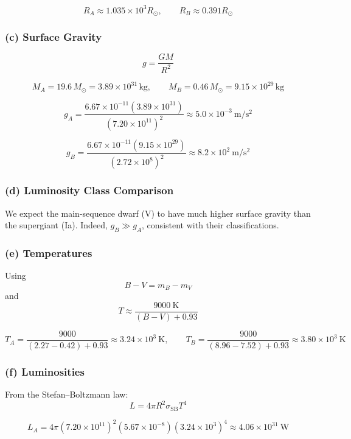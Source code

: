 \documentclass{article}
\begin{document}
\[
R_A \approx 1.035\times10^{3}R_\odot, \qquad
R_B \approx 0.391R_\odot
\]

\subsubsection*{(c) Surface Gravity}

\[
g = \frac{GM}{R^2}
\]

\[
M_A = 19.6\,M_\odot = 3.89\times10^{31}\,\mathrm{kg}, \qquad
M_B = 0.46\,M_\odot = 9.15\times10^{29}\,\mathrm{kg}
\]

\[
g_A = \frac{6.67\times10^{-11}(3.89\times10^{31})}{(7.20\times10^{11})^2}
     \approx 5.0\times10^{-3}~\mathrm{m/s^2}
\]

\[
g_B = \frac{6.67\times10^{-11}(9.15\times10^{29})}{(2.72\times10^{8})^2}
     \approx 8.2\times10^{2}~\mathrm{m/s^2}
\]

\subsubsection*{(d) Luminosity Class Comparison}

We expect the main-sequence dwarf (V) to have much higher surface gravity than the supergiant (Ia).  
Indeed, $g_B \gg g_A$, consistent with their classifications.

\subsubsection*{(e) Temperatures}

Using
\begin{equation}
B - V = m_B - m_V
\tag{13.35}
\end{equation}
and
\begin{equation}
T \approx \frac{9000~\mathrm{K}}{(B - V) + 0.93}
\tag{13.36}
\end{equation}

\[
T_A = \frac{9000}{(2.27 - 0.42) + 0.93} \approx 3.24\times10^{3}~\mathrm{K}, \qquad
T_B = \frac{9000}{(8.96 - 7.52) + 0.93} \approx 3.80\times10^{3}~\mathrm{K}
\]

\subsubsection*{(f) Luminosities}

From the Stefan–Boltzmann law:
\[
L = 4\pi R^2\sigma_\mathrm{SB}T^4
\]

\[
L_A = 4\pi(7.20\times10^{11})^2(5.67\times10^{-8})(3.24\times10^{3})^4
     \approx 4.06\times10^{31}~\mathrm{W}
\]
\end{document}
